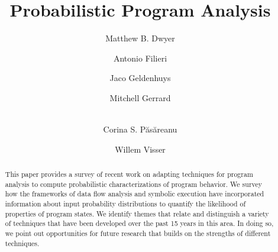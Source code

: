 \documentclass[runningheads,a4paper]{llncs}
\begin{document}
\mainmatter  %

\newcommand{\mycomment}[1]{\textit{\textcolor{red}{#1}}}
\newcommand{\ignore}[1]{}

\title{Probabilistic Program Analysis}


\author{Matthew B. Dwyer
\and Antonio Filieri\and Jaco Geldenhuys\and Mitchell Gerrard\and\\
Corina S. P\u{a}s\u{a}reanu\and Willem Visser}
%


%
%

\maketitle


\begin{abstract}
This paper provides a survey of recent work on adapting 
techniques for program analysis to compute probabilistic
characterizations of program behavior.  We survey how the
frameworks of data flow analysis and symbolic execution have
incorporated information about input probability distributions
to quantify the likelihood of properties of program states.
We identify themes that relate and distinguish a variety of
techniques that have been developed over the past 15 years
in this area.  In doing so, we point out opportunities for
future research that builds on the strengths of different techniques.
\end{abstract}
\end{document}
